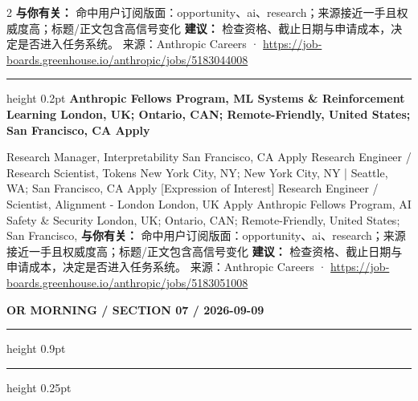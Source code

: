 \documentclass[10.5pt]{ctexart}
\begin{document}
\begin{multicols}{2}
\textbf{与你有关：} 命中用户订阅版面：opportunity、ai、research；来源接近一手且权威度高；标题/正文包含高信号变化
\textbf{建议：} 检查资格、截止日期与申请成本，决定是否进入任务系统。
{\footnotesize\color{ormuted} 来源：Anthropic Careers · \url{https://job-boards.greenhouse.io/anthropic/jobs/5183044008}}
\vspace{2mm}
\hrule height 0.2pt
\vspace{2mm}
{\large\bfseries Anthropic Fellows Program, ML Systems \& Reinforcement Learning London, UK; Ontario, CAN; Remote-Friendly, United States; San Francisco, CA Apply}\par
[Expression of Interest] Research Manager, Interpretability San Francisco, CA Apply Research Engineer / Research Scientist, Tokens New York City, NY; New York City, NY | Seattle, WA; San Francisco, CA Apply [Expression of Interest] Research Engineer / Scientist, Alignment - London London, UK Apply Anthropic Fellows Program, AI Safety \& Security London, UK; Ontario, CAN; Remote-Friendly, United States; San Francisco, 
\textbf{与你有关：} 命中用户订阅版面：opportunity、ai、research；来源接近一手且权威度高；标题/正文包含高信号变化
\textbf{建议：} 检查资格、截止日期与申请成本，决定是否进入任务系统。
{\footnotesize\color{ormuted} 来源：Anthropic Careers · \url{https://job-boards.greenhouse.io/anthropic/jobs/5183051008}}
\end{multicols}
\newpage
{\small\bfseries OR MORNING / SECTION 07 / 2026-09-09}
\vspace{2mm}
\hrule height 0.9pt
\vspace{1.5mm}
\hrule height 0.25pt
\vspace{4mm}
\end{document}
